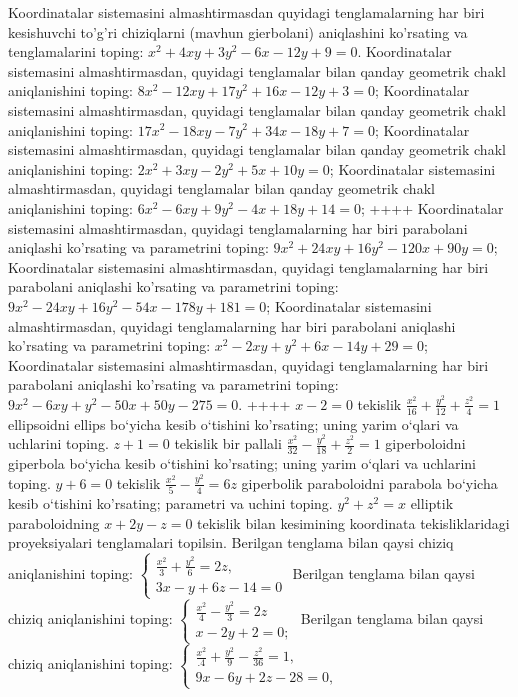 Koordinatalar sistemasini almashtirmasdan quyidagi tenglamalarning har biri kesishuvchi to'g'ri chiziqlarni (mavhun gierbolani) aniqlashini ko'rsating va tenglamalarini toping: $x^2+4 x y+3 y^2-6 x-12 y+9=0$.
Koordinatalar sistemasini almashtirmasdan, quyidagi tenglamalar bilan qanday geometrik chakl aniqlanishini toping: $8 x^2-12 x y+17 y^2+16 x-12 y+3=0$;
Koordinatalar sistemasini almashtirmasdan, quyidagi tenglamalar bilan qanday geometrik chakl aniqlanishini toping: $17 x^2-18 x y-7 y^2+34 x-18 y+7=0$;
Koordinatalar sistemasini almashtirmasdan, quyidagi tenglamalar bilan qanday geometrik chakl aniqlanishini toping: $2 x^2+3 x y-2 y^2+5 x+10 y=0$;
Koordinatalar sistemasini almashtirmasdan, quyidagi tenglamalar bilan qanday geometrik chakl aniqlanishini toping: $6 x^2-6 x y+9 y^2-4 x+18 y+14=0$;
++++
Koordinatalar sistemasini almashtirmasdan, quyidagi tenglamalarning har biri parabolani aniqlashi ko'rsating va parametrini toping: $9 x^2+24 x y+16 y^2-120 x+90 y=0$;
Koordinatalar sistemasini almashtirmasdan, quyidagi tenglamalarning har biri parabolani aniqlashi ko'rsating va parametrini toping: $9 x^2-24 x y+16 y^2-54 x-178 y+181=0$;
Koordinatalar sistemasini almashtirmasdan, quyidagi tenglamalarning har biri parabolani aniqlashi ko'rsating va parametrini toping: $x^2-2 x y+y^2+6 x-14 y+29=0$;
Koordinatalar sistemasini almashtirmasdan, quyidagi tenglamalarning har biri parabolani aniqlashi ko'rsating va parametrini toping: $9 x^2-6 x y+y^2-50 x+50 y-275=0$.
++++
$x-2=0$ tekislik $\frac{x^2}{16}+\frac{y^2}{12}+\frac{z^2}{4}=1$ ellipsoidni ellips bo‘yicha kesib o‘tishini ko'rsating; uning yarim o‘qlari va uchlarini toping.
$z+1=0$ tekislik bir pallali $\frac{x^2}{32}-\frac{y^2}{18}+\frac{z^2}{2}=1$ giperboloidni giperbola bo‘yicha kesib o‘tishini ko'rsating; uning yarim o‘qlari va uchlarini toping.
$y+6=0$ tekislik $\frac{x^2}{5}-\frac{y^2}{4}=6 z$ giperbolik paraboloidni parabola bo‘yicha kesib o‘tishini ko'rsating; parametri va uchini toping.
$y^2+z^2=x$ elliptik paraboloidning $x+2 y-z=0$ tekislik bilan kesimining koordinata tekisliklaridagi proyeksiyalari tenglamalari topilsin.
Berilgan tenglama bilan qaysi chiziq aniqlanishini toping: $\left\{\begin{array}{l}\frac{x^2}{3}+\frac{y^2}{6}=2 z, \\ 3 x-y+6 z-14=0\end{array}\right.$
Berilgan tenglama bilan qaysi chiziq aniqlanishini toping: $\left\{\begin{array}{l}\frac{x^2}{4}-\frac{y^2}{3}=2 z \\ x-2 y+2=0 ;\end{array}\right.$
Berilgan tenglama bilan qaysi chiziq aniqlanishini toping: $\left\{\begin{array}{l}\frac{x^2}{.4}+\frac{y^2}{9}-\frac{z^2}{36}=1, \\ 9 x-6 y+2 z-28=0,\end{array}\right.$